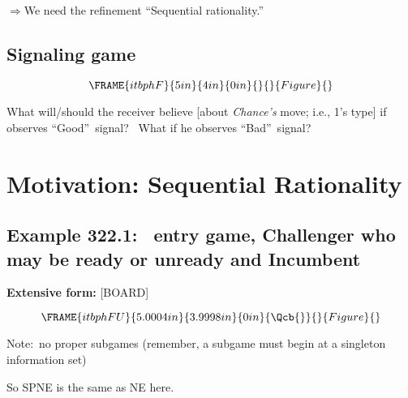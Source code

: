 \documentclass{article}
\begin{document}
$\Rightarrow $We need the refinement \textquotedblleft Sequential
rationality.\textquotedblright

\bigskip

\bigskip

\subsection{Signaling game}

\[
\FRAME{itbphF}{5in}{4in}{0in}{}{}{Figure}{\special{language "Scientific
Word";type "GRAPHIC";maintain-aspect-ratio TRUE;display "USEDEF";valid_file
"T";width 5in;height 4in;depth 0in;original-width 7.8006in;original-height
5.7164in;cropleft "0";croptop "1";cropright "1";cropbottom "0";tempfilename
'JSHANV2W.wmf';tempfile-properties "XPR";}}
\]

What will/should the receiver believe [about \textit{Chance's }move; i.e.,
1's type] if observes \textquotedblleft Good\textquotedblright\ signal? \
What if he observes \textquotedblleft Bad\textquotedblright\ signal?

\bigskip

\section{Motivation: Sequential Rationality}

\subsection{Example 322.1: \ entry game, Challenger who may be ready or
unready and Incumbent}

\textbf{Extensive form: }[BOARD]\textbf{\bigskip }

\begin{equation}
\FRAME{itbphFU}{5.0004in}{3.9998in}{0in}{\Qcb{}}{}{Figure}{\special{language
"Scientific Word";type "GRAPHIC";maintain-aspect-ratio TRUE;display
"USEDEF";valid_file "T";width 5.0004in;height 3.9998in;depth
0in;original-width 5.6886in;original-height 3.5201in;cropleft "0";croptop
"1";cropright "1";cropbottom "0";tempfilename
'JSHANV30.wmf';tempfile-properties "XPR";}}
\end{equation}

Note:\ no proper subgames (remember, a subgame must begin at a singleton
information set)

So SPNE is the same as NE here.\bigskip

\bigskip

\bigskip
\end{document}
